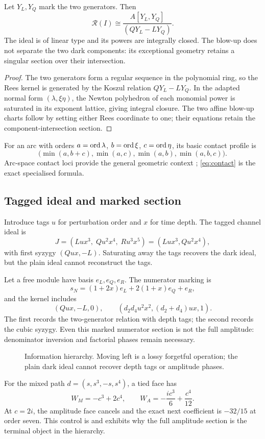 \begin{proposition}\label{prop:rees}
Let \(Y_L,Y_Q\) mark the two generators.  Then
\[
\mathcal R(I)\cong
\frac{A[Y_L,Y_Q]}{(QY_L-LY_Q)}.
\]
The ideal is of linear type and its powers are integrally closed.  The blow-up
does not separate the two dark components: its exceptional geometry retains a
singular section over their intersection.
\end{proposition}
\begin{proof}
The two generators form a regular sequence in the polynomial ring, so the Rees
kernel is generated by the Koszul relation \(QY_L-LY_Q\).  In the adapted
normal form \((\lambda,\xi\eta)\), the Newton polyhedron of each monomial power
is saturated in its exponent lattice, giving integral closure.  The two affine
blow-up charts follow by setting either Rees coordinate to one; their equations
retain the component-intersection section.
\end{proof}

For an arc with orders
\(a=\operatorname{ord}\lambda\), \(b=\operatorname{ord}\xi\), \(c=\operatorname{ord}\eta\), its basic contact profile is
\begin{equation}\label{eq:contact}
\bigl(\min(a,b+c),\min(a,c),\min(a,b),\min(a,b,c)\bigr).
\end{equation}
Arc-space contact loci provide the general geometric context
\parencite{Ein2004}; \cref{eq:contact} is the exact specialised formula.

\subsection{Tagged ideal and marked section}

Introduce tags \(u\) for perturbation order and \(x\) for time depth.  The
tagged channel ideal is
\begin{equation}
J=(Lu x^3,\;Qu^2x^4,\;Ru^3x^5)=(Lu x^3,Qu^2x^4),
\end{equation}
with first syzygy \((Qux,-L)\).  Saturating away the tags recovers the dark
ideal, but the plain ideal cannot reconstruct the tags.

Let a free module have basis \(e_L,e_Q,e_R\).  The numerator marking is
\[
s_N=(1+2x)e_L+2(1+x)e_Q+e_R,
\]
and the kernel includes
\[
(Qux,-L,0),\qquad(d_2d_4u^2x^2,(d_2+d_4)ux,1).
\]
The first records the two-generator relation with depth tags; the second records
the cubic syzygy.  Even this marked numerator section is not the full amplitude:
denominator inversion and factorial phases remain necessary.

\begin{figure}[ht]
\centering
\caption{Information hierarchy.  Moving left is a lossy forgetful operation;
the plain dark ideal cannot recover depth tags or amplitude phases.}
\label{fig:hierarchy}
\end{figure}

For the mixed path \(d=(s,s^3,-s,s^4)\), a tied face has
\[
W_M=-c^3+2c^4,\qquad W_A=-\frac{i c^3}{6}+\frac{c^4}{12}.
\]
At \(c=2i\), the amplitude face cancels and the exact next coefficient is
\(-32/15\) at order seven.  This control is  and
exhibits why the full amplitude section is the terminal object in the hierarchy.
